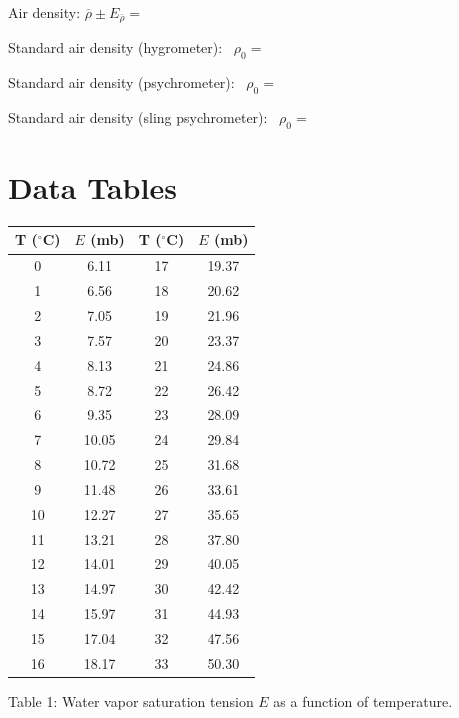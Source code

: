 \documentclass{article}
\begin{document}
Air density: $\overline{\rho} \pm E_{\bar \rho} = $ \underline{\hspace{4cm}}
 
\vspace{5mm}
Standard air density (hygrometer): ~$\rho_0 =$
\underline{\hspace{4cm}}
\vspace{5mm}

Standard air density (psychrometer): ~$\rho_0 =$
\underline{\hspace{4cm}}

\vspace{5mm}

Standard air density (sling psychrometer): ~$\rho_0 =$
\underline{\hspace{4cm}}

\nocite{ahrens2006meteorology,stull2000meteorology}
\newpage
\appendix
\section{Data Tables}


\begin{center}
\begin{tabular}{|c|c||c|c|} \hline
T ($^{\circ}$C)  &  $E$ (mb)  & T ($^{\circ}$C)  & $E$ (mb)  \\
\hline
0  &  6.11  &  17  &  19.37  \\
\hline
1  &  6.56  &  18  &  20.62  \\
\hline
2  &  7.05  &  19  &  21.96  \\
\hline
3  &  7.57  &  20  &  23.37  \\
\hline
4  &  8.13  &  21  &  24.86  \\
\hline
5  &  8.72  &  22  &  26.42  \\
\hline
6  &  9.35  &  23  &  28.09  \\
\hline
7  &  10.05  &  24  &  29.84  \\
\hline
8  &  10.72  &  25  &  31.68  \\
\hline
9  &  11.48  &  26  &  33.61  \\
\hline
10  &  12.27  &  27  &  35.65  \\
\hline
11  &  13.21  &  28  &  37.80  \\
\hline
12  &  14.01  &  29  &  40.05  \\
\hline
13  &  14.97  &  30  &  42.42  \\
\hline
14  &  15.97  &  31  &  44.93  \\
\hline
15  &  17.04  &  32  &  47.56  \\
\hline
16  &  18.17  &  33  &  50.30  \\
\hline
\end{tabular}

Table 1: Water vapor saturation tension $E$ as a function of temperature.
\end{center}
\end{document}
